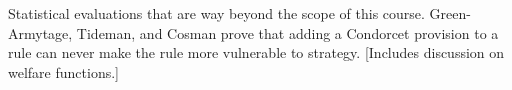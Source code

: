 Statistical evaluations that are way beyond the scope of this course.  Green-Armytage, Tideman, and Cosman prove that adding a Condorcet provision to a rule can never make the rule more vulnerable to strategy. [Includes discussion on welfare functions.]
